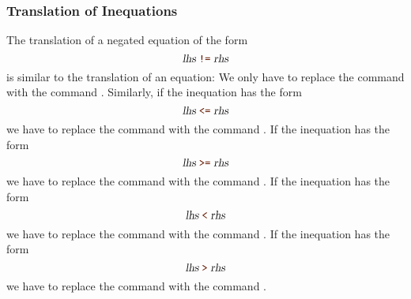 \subsubsection{Translation of Inequations}
The translation of a negated equation of the form
\[ \textsl{lhs}\;\mytt{!=}\;\textsl{rhs} \]
is similar to the translation of an equation:  We only have to replace the command  with the
command .  Similarly, if the inequation has the form
\[ \textsl{lhs}\;\mytt{<=}\;\textsl{rhs} \]
we have to replace the command  with the command .
If the inequation has the form
\[ \textsl{lhs}\;\mytt{>=}\;\textsl{rhs} \]
we have to replace the command  with the command .
If the inequation has the form
\[ \textsl{lhs}\;\mytt{<}\;\textsl{rhs} \]
we have to replace the command  with the command .
If the inequation has the form
\[ \textsl{lhs}\;\mytt{>}\;\textsl{rhs} \]
we have to replace the command  with the command .

